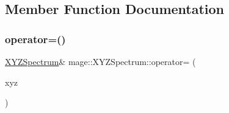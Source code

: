 \subsection{Member Function Documentation}
\hypertarget{structmage_1_1_x_y_z_spectrum_a99b3956d6e9c0255fdef3ad9ea9e4d3a}{}\label{structmage_1_1_x_y_z_spectrum_a99b3956d6e9c0255fdef3ad9ea9e4d3a} 
\subsubsection{\texorpdfstring{operator=()}{operator=()}}
{\footnotesize\ttfamily \hyperlink{structmage_1_1_x_y_z_spectrum}{X\+Y\+Z\+Spectrum}\& mage\+::\+X\+Y\+Z\+Spectrum\+::operator= (\begin{DoxyParamCaption}\item[{const \hyperlink{structmage_1_1_x_y_z_spectrum}{X\+Y\+Z\+Spectrum} \&}]{xyz }\end{DoxyParamCaption})}

